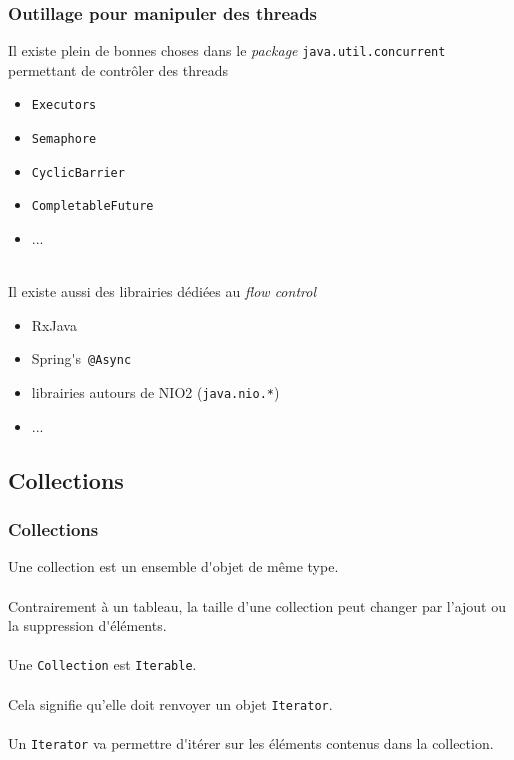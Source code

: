 \begin{frame}[fragile]
	\frametitle{Outillage pour manipuler des threads}    
    Il existe plein de bonnes choses dans le \textit{package} {\lstinline[basicstyle=\ttfamily\color{blue}]|java.util.concurrent|} permettant de contr\^{o}ler des threads
    \begin{itemize}
    	\item {\lstinline[basicstyle=\ttfamily\color{blue}]|Executors|}
    	\item {\lstinline[basicstyle=\ttfamily\color{blue}]|Semaphore|}
    	\item {\lstinline[basicstyle=\ttfamily\color{blue}]|CyclicBarrier|}
        \item {\lstinline[basicstyle=\ttfamily\color{blue}]|CompletableFuture|}
        \item ...
    \end{itemize}
    ~\\
    Il existe aussi des librairies d\'{e}di\'{e}es au \textit{flow control}
    \begin{itemize}
    	\item RxJava
    	\item Spring\'{}s{\lstinline[basicstyle=\ttfamily\color{blue}]| @Async|}
        \item librairies autours de NIO2 ({\lstinline[basicstyle=\ttfamily\color{blue}]|java.nio.*|})
        \item ...
    \end{itemize}
\end{frame}

\subsection{Collections}
\begin{frame}[fragile]
	\frametitle{Collections}
    Une collection est un ensemble d\'{}objet de m\^{e}me type.
    \\~\\
    Contrairement \`{a} un tableau, la taille d'une collection peut changer par l'ajout ou la suppression d\'{}\'{e}l\'{e}ments.
    \\~\\
    Une {\lstinline[basicstyle=\ttfamily\color{blue}]|Collection|} est {\lstinline[basicstyle=\ttfamily\color{blue}]|Iterable|}.
    \\~\\
    Cela signifie qu'elle doit renvoyer un objet {\lstinline[basicstyle=\ttfamily\color{blue}]|Iterator|}.
    \\~\\
    Un {\lstinline[basicstyle=\ttfamily\color{blue}]|Iterator|} va permettre d\'{}it\'{e}rer sur les \'{e}l\'{e}ments contenus dans la collection.
\end{frame}

